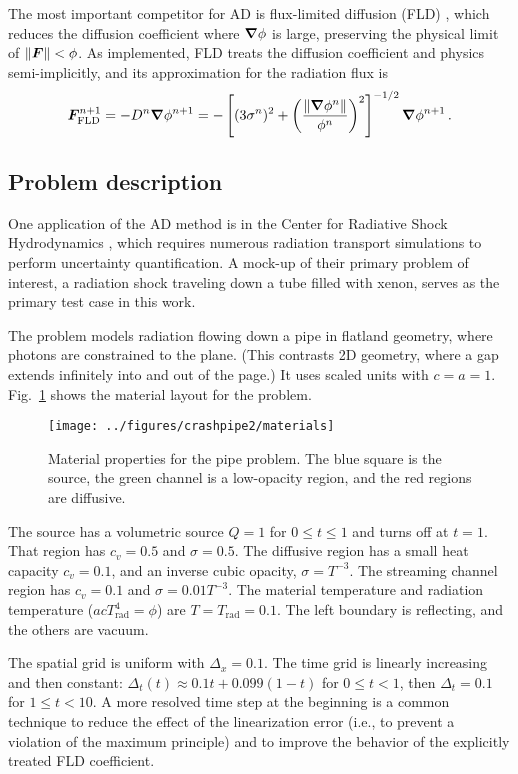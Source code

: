 \documentclass[11pt,letter,twoside]{mc2011}
\begin{document}
The most important competitor for AD is flux-limited diffusion (FLD)
\cite{Ols2000}, which
reduces the diffusion coefficient where $\bm{\nabla} \phi$ is large, preserving the
physical limit of $\left\| \bm{F} \right\| < \phi$.
As implemented, FLD treats the diffusion
coefficient and physics semi-implicitly, and its approximation for the
radiation flux is
\begin{equation*}
  \bm{F}_\text{FLD}^{n+1} = - D^{n} \bm{\nabla} \phi^{n+1}  = -\left[ (3\sigma^{n})^2
  + \left( \frac{\left\| \bm{\nabla} \phi^{n} \right\|}{\phi^{n}}  \right)^2 \right]^{-1/2}
  \bm{\nabla} \phi^{n+1}\,.
\end{equation*}


\subsection{Problem description}
One application of the AD method is in the Center for Radiative Shock
Hydrodynamics \cite{Crash2010}, which requires numerous radiation transport simulations
to perform uncertainty quantification. A mock-up of their primary problem
of interest, a radiation shock traveling down a tube filled with xenon, serves
as the primary test case in this work.

The problem models radiation flowing down a pipe in flatland geometry, where
photons are constrained to the plane. (This contrasts 2D geometry, where a gap
extends infinitely into and out of the page.) It uses scaled units with $c=a=1$. Fig.~\ref{fig:crashpipeMaterial}
shows the material layout for the problem.
\begin{figure}[htb]
  \centering
  \texttt{[image: ../figures/crashpipe2/materials]}
  \caption{Material properties for the pipe problem. The blue square is the
  source, the green channel is a low-opacity region, and the red regions are
  diffusive.}
  \label{fig:crashpipeMaterial}
\end{figure}
The source has a volumetric source
$Q=1$ for $0 \le t \le 1$ and turns off at $t=1$.
That region has $c_v=0.5$ and
$\sigma=0.5$. The diffusive region has a small heat capacity $c_v=0.1$, and an
inverse cubic opacity, $\sigma=T^{-3}$. The streaming channel region has
$c_v=0.1$ and $\sigma=0.01 T^{-3}$. The material temperature and radiation
temperature ($a c T_\text{rad}^4 = \phi$) are $T=T_\text{rad}=0.1$. The left
boundary is reflecting, and the others are vacuum.

The spatial grid is uniform with $\Delta_x=0.1$. The time grid is linearly
increasing and then constant: $\Delta_t(t)\approx 0.1 t + 0.099 (1 - t)$ for $0
\le t < 1$, then $\Delta_t=0.1$ for $1 \le t < 10$. A more resolved time step at
the beginning is a common technique to reduce the effect of the linearization
error (i.e., to prevent a violation of the maximum principle) and to improve
the behavior of the explicitly treated FLD coefficient.
\end{document}
